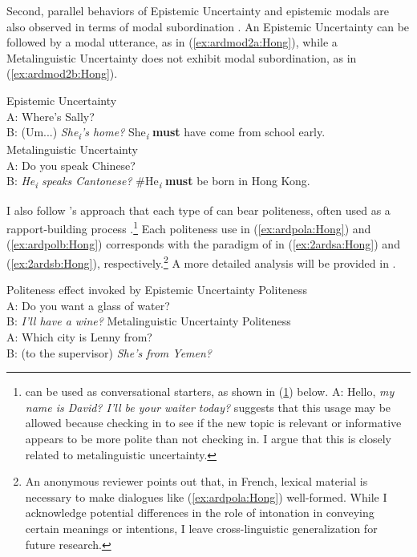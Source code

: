 \documentclass[output=paper,colorlinks,citecolor=brown]{langscibook}
\begin{document}
\noindent{}Second, parallel behaviors of Epistemic Uncertainty  and epistemic modals are also observed in terms of modal subordination \citep{roberts1987modal, roberts1989modal}. An Epistemic Uncertainty  can be followed by a modal utterance, as in (\ref{ex:ardmod2a:Hong}), while a Metalinguistic Uncertainty  does not exhibit modal subordination, as in (\ref{ex:ardmod2b:Hong}). 

\ea \label{ex:ardmod2:Hong}
    \ea \label{ex:ardmod2a:Hong} Epistemic Uncertainty \\
    A: Where's Sally?\\
    B: (Um...) \textit{She\textsubscript{i}'s home?} She\textsubscript{\textit{i}} \textbf{must} have come from school early.\\
    \ex \label{ex:ardmod2b:Hong} Metalinguistic Uncertainty \\
    A: Do you speak Chinese?\\
    B: \textit{He\textsubscript{i} speaks Cantonese?} \#He\textsubscript{\textit{i}} \textbf{must} be born in Hong Kong.\\
    \z
\z

I also follow \citet{jeong2018intonation,jeong2021deriving}'s approach that each type of  can bear politeness, often used as a rapport-building process \citep{podesva2011salience, levon2016gender, jeong2018intonation, jeong2021deriving}.\footnote{ can be used as conversational starters, as shown in (\ref{ex:ardini:Hong}) below.
\ea  \label{ex:ardini:Hong} A: Hello, \textit{my name is David? I'll be your waiter today?}
\z
\citet{jeong2021deriving} suggests that this usage may be allowed because checking in to see if the new topic is relevant or informative appears to be more polite than not checking in. I argue that this is closely related to metalinguistic uncertainty.} Each politeness use in (\ref{ex:ardpola:Hong}) and (\ref{ex:ardpolb:Hong}) corresponds with the paradigm of  in (\ref{ex:2ardsa:Hong}) and (\ref{ex:2ardsb:Hong}), respectively.\footnote{An anonymous reviewer points out that, in French, lexical material is necessary to make dialogues like (\ref{ex:ardpola:Hong}) well-formed. While I acknowledge potential differences in the role of intonation in conveying certain meanings or intentions, I leave cross-linguistic generalization for future research.} A more detailed analysis will be provided in .

\ea \label{ex:ardpol:Hong} Politeness effect invoked by 
    \ea \label{ex:ardpola:Hong} Epistemic Uncertainty Politeness\\
    A: Do you want a glass of water?\\
    B: \textit{I'll have a wine?}
    \ex \label{ex:ardpolb:Hong} Metalinguistic Uncertainty Politeness\\ 
    A: Which city is Lenny from?\\
    B: (to the supervisor) \textit{She's from Yemen?}
    \z
\z
\end{document}
